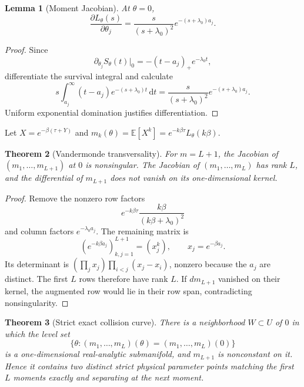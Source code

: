 \documentclass[11pt]{article}
\newtheorem{theorem}{Theorem}[section]
\newtheorem{lemma}[theorem]{Lemma}
\newcommand{\dd}{\,\mathrm d}
\begin{document}
\begin{lemma}[Moment Jacobian]
At $\theta=0$,
\[
\frac{\partial L_\theta(s)}{\partial\theta_j}
=\frac{s}{(s+\lambda_0)^2}e^{-(s+\lambda_0)a_j}.
\]
\end{lemma}

\begin{proof}
Since
\[
\partial_{\theta_j}S_\theta(t)|_0=-(t-a_j)_+e^{-\lambda_0t},
\]
differentiate the survival integral and calculate
\[
s\int_{a_j}^\infty(t-a_j)e^{-(s+\lambda_0)t}\dd t
=\frac{s}{(s+\lambda_0)^2}e^{-(s+\lambda_0)a_j}.
\]
Uniform exponential domination justifies differentiation.
\end{proof}

Let $X=e^{-\beta(\tau+Y)}$ and $m_k(\theta)=\mathbb E[X^k]=e^{-k\beta\tau}L_\theta(k\beta)$.

\begin{theorem}[Vandermonde transversality]
For $m=L+1$, the Jacobian of $(m_1,\ldots,m_{L+1})$ at $0$ is nonsingular.  The Jacobian of $(m_1,\ldots,m_L)$ has rank $L$, and the differential of $m_{L+1}$ does not vanish on its one-dimensional kernel.
\end{theorem}

\begin{proof}
Remove the nonzero row factors
\[
e^{-k\beta\tau}\frac{k\beta}{(k\beta+\lambda_0)^2}
\]
and column factors $e^{-\lambda_0a_j}$.  The remaining matrix is
\[
(e^{-k\beta a_j})_{k,j=1}^{L+1}=(x_j^k),
\qquad x_j=e^{-\beta a_j}.
\]
Its determinant is $(\prod_jx_j)\prod_{i<j}(x_j-x_i)$, nonzero because the $a_j$ are distinct.  The first $L$ rows therefore have rank $L$.  If $dm_{L+1}$ vanished on their kernel, the augmented row would lie in their row span, contradicting nonsingularity.
\end{proof}

\begin{theorem}[Strict exact collision curve]
There is a neighborhood $W\subset U$ of $0$ in which the level set
\[
\{\theta:(m_1,\ldots,m_L)(\theta)=(m_1,\ldots,m_L)(0)\}
\]
is a one-dimensional real-analytic submanifold, and $m_{L+1}$ is nonconstant on it.  Hence it contains two distinct strict physical parameter points matching the first $L$ moments exactly and separating at the next moment.
\end{theorem}
\end{document}
